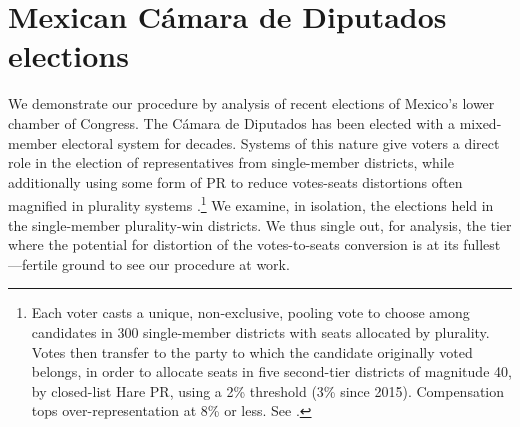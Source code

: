 \documentclass[letter,12pt]{article}
\begin{document}
\section{Mexican C\'amara de Diputados elections}

We demonstrate our procedure by analysis of recent elections of Mexico's lower chamber of Congress. The C\'amara de Diputados has been elected with a mixed-member electoral system for decades. Systems of this nature give voters a direct role in the election of representatives from single-member districts, while additionally using some form of PR to reduce votes-seats distortions often magnified in plurality systems \citep{shugart.wattenbergIntro2001}.\footnote{Each voter casts a unique, non-exclusive, pooling vote to choose among candidates in 300 single-member districts with seats allocated by plurality. Votes then transfer to the party to which the candidate originally voted belongs, in order to allocate seats in five second-tier districts of magnitude 40, by closed-list Hare PR, using a 2\% threshold (3\% since 2015). Compensation tops over-representation at 8\% or less. See \citet{weldonMixedMemberSys2001}.} We examine, in isolation, the elections held in the single-member plurality-win districts. We thus single out, for analysis, the tier where the potential for distortion of the votes-to-seats conversion is at its fullest---fertile ground to see our procedure at work.
\end{document}
